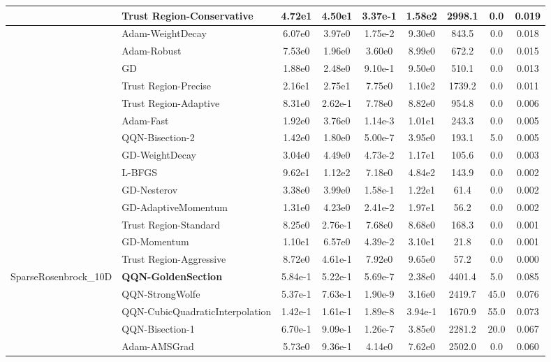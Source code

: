 \documentclass[10pt]{article}
\begin{document}
\begin{longtable}{|l|l|c|c|c|c|c|c|c|}
\hline
 & Trust Region-Conservative & 4.72e1 & 4.50e1 & 3.37e-1 & 1.58e2 & 2998.1 & 0.0 & 0.019 \\
\hline
 & Adam-WeightDecay & 6.07e0 & 3.97e0 & 1.75e-2 & 9.30e0 & 843.5 & 0.0 & 0.018 \\
\hline
 & Adam-Robust & 7.53e0 & 1.96e0 & 3.60e0 & 8.99e0 & 672.2 & 0.0 & 0.015 \\
\hline
 & GD & 1.88e0 & 2.48e0 & 9.10e-1 & 9.50e0 & 510.1 & 0.0 & 0.013 \\
\hline
 & Trust Region-Precise & 2.16e1 & 2.75e1 & 7.75e0 & 1.10e2 & 1739.2 & 0.0 & 0.011 \\
\hline
 & Trust Region-Adaptive & 8.31e0 & 2.62e-1 & 7.78e0 & 8.82e0 & 954.8 & 0.0 & 0.006 \\
\hline
 & Adam-Fast & 1.92e0 & 3.76e0 & 1.14e-3 & 1.01e1 & 243.3 & 0.0 & 0.005 \\
\hline
 & QQN-Bisection-2 & 1.42e0 & 1.80e0 & 5.00e-7 & 3.95e0 & 193.1 & 5.0 & 0.005 \\
\hline
 & GD-WeightDecay & 3.04e0 & 4.49e0 & 4.73e-2 & 1.17e1 & 105.6 & 0.0 & 0.003 \\
\hline
 & L-BFGS & 9.62e1 & 1.12e2 & 7.18e0 & 4.84e2 & 143.9 & 0.0 & 0.002 \\
\hline
 & GD-Nesterov & 3.38e0 & 3.99e0 & 1.58e-1 & 1.22e1 & 61.4 & 0.0 & 0.002 \\
\hline
 & GD-AdaptiveMomentum & 1.31e0 & 4.23e0 & 2.41e-2 & 1.97e1 & 56.2 & 0.0 & 0.002 \\
\hline
 & Trust Region-Standard & 8.25e0 & 2.76e-1 & 7.68e0 & 8.68e0 & 168.3 & 0.0 & 0.001 \\
\hline
 & GD-Momentum & 1.10e1 & 6.57e0 & 4.39e-2 & 3.10e1 & 21.8 & 0.0 & 0.001 \\
\hline
 & Trust Region-Aggressive & 8.72e0 & 4.61e-1 & 7.92e0 & 9.65e0 & 57.2 & 0.0 & 0.000 \\
SparseRosenbrock\_10D & \textbf{QQN-GoldenSection} & 5.84e-1 & 5.22e-1 & 5.69e-7 & 2.38e0 & 4401.4 & 5.0 & 0.085 \\
\hline
 & QQN-StrongWolfe & 5.37e-1 & 7.63e-1 & 1.90e-9 & 3.16e0 & 2419.7 & 45.0 & 0.076 \\
\hline
 & QQN-CubicQuadraticInterpolation & 1.42e-1 & 1.61e-1 & 1.89e-8 & 3.94e-1 & 1670.9 & 55.0 & 0.073 \\
\hline
 & QQN-Bisection-1 & 6.70e-1 & 9.09e-1 & 1.26e-7 & 3.85e0 & 2281.2 & 20.0 & 0.067 \\
\hline
 & Adam-AMSGrad & 5.73e0 & 9.36e-1 & 4.14e0 & 7.62e0 & 2502.0 & 0.0 & 0.060 \\

\end{longtable}
\end{document}
